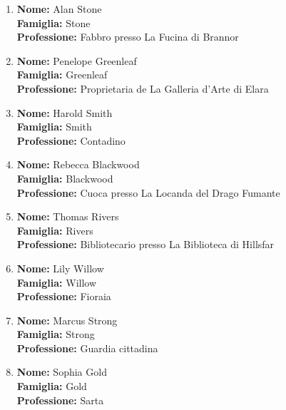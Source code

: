 \documentclass{article}
\begin{document}
\begin{enumerate}
  \item \textbf{Nome:} Alan Stone\\
  \textbf{Famiglia:} Stone\\
  \textbf{Professione:} Fabbro presso La Fucina di Brannor

  \item \textbf{Nome:} Penelope Greenleaf\\
  \textbf{Famiglia:} Greenleaf\\
  \textbf{Professione:} Proprietaria de La Galleria d'Arte di Elara

  \item \textbf{Nome:} Harold Smith\\
  \textbf{Famiglia:} Smith\\
  \textbf{Professione:} Contadino

  \item \textbf{Nome:} Rebecca Blackwood\\
  \textbf{Famiglia:} Blackwood\\
  \textbf{Professione:} Cuoca presso La Locanda del Drago Fumante

  \item \textbf{Nome:} Thomas Rivers\\
  \textbf{Famiglia:} Rivers\\
  \textbf{Professione:} Bibliotecario presso La Biblioteca di Hillsfar

  \item \textbf{Nome:} Lily Willow\\
  \textbf{Famiglia:} Willow\\
  \textbf{Professione:} Fioraia

  \item \textbf{Nome:} Marcus Strong\\
  \textbf{Famiglia:} Strong\\
  \textbf{Professione:} Guardia cittadina

  \item \textbf{Nome:} Sophia Gold\\
  \textbf{Famiglia:} Gold\\
  \textbf{Professione:} Sarta
\end{enumerate}
\end{document}
